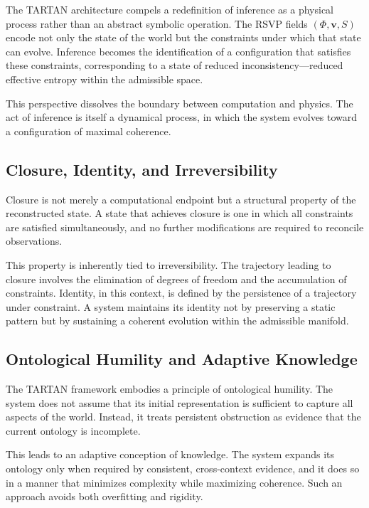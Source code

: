\documentclass[12pt, oneside]{article}
\begin{document}
The TARTAN architecture compels a redefinition of inference as a physical process rather than an abstract symbolic operation. The RSVP fields $(\Phi, \mathbf{v}, S)$ encode not only the state of the world but the constraints under which that state can evolve. Inference becomes the identification of a configuration that satisfies these constraints, corresponding to a state of reduced inconsistency---reduced effective entropy within the admissible space.

This perspective dissolves the boundary between computation and physics. The act of inference is itself a dynamical process, in which the system evolves toward a configuration of maximal coherence.

\subsection{Closure, Identity, and Irreversibility}

Closure is not merely a computational endpoint but a structural property of the reconstructed state. A state that achieves closure is one in which all constraints are satisfied simultaneously, and no further modifications are required to reconcile observations.

This property is inherently tied to irreversibility. The trajectory leading to closure involves the elimination of degrees of freedom and the accumulation of constraints. Identity, in this context, is defined by the persistence of a trajectory under constraint. A system maintains its identity not by preserving a static pattern but by sustaining a coherent evolution within the admissible manifold.

\subsection{Ontological Humility and Adaptive Knowledge}

The TARTAN framework embodies a principle of ontological humility. The system does not assume that its initial representation is sufficient to capture all aspects of the world. Instead, it treats persistent obstruction as evidence that the current ontology is incomplete.

This leads to an adaptive conception of knowledge. The system expands its ontology only when required by consistent, cross-context evidence, and it does so in a manner that minimizes complexity while maximizing coherence. Such an approach avoids both overfitting and rigidity.
\end{document}
